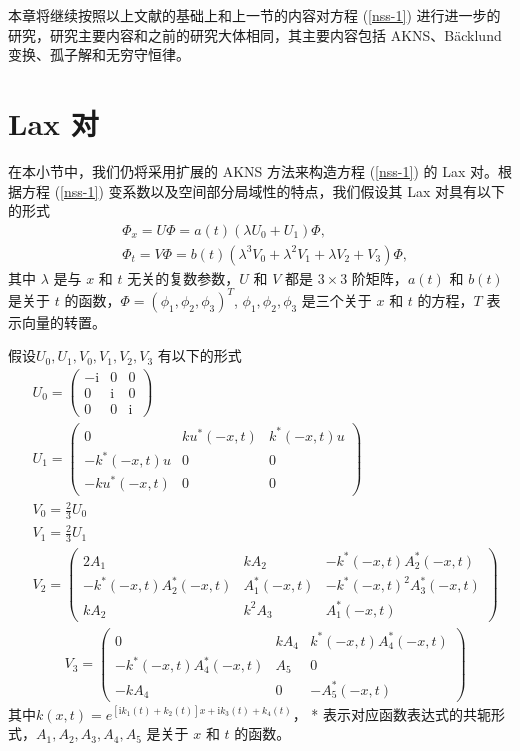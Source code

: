 本章将继续按照以上文献的基础上和上一节的内容对方程 (\ref{nss-1}) 进行进一步的研究，研究主要内容和之前的研究大体相同，其主要内容包括 AKNS、B\"{a}cklund 变换、孤子解和无穷守恒律。

\section{Lax 对}
在本小节中，我们仍将采用扩展的 AKNS 方法来构造方程 (\ref{nss-1}) 的 Lax 对。根据方程 (\ref{nss-1}) 变系数以及空间部分局域性的特点，我们假设其 Lax 对具有以下的形式
\begin{align}
  & \Phi_{x} = U\Phi = a(t)(\lambda U_{0} + U_{1})\Phi, \label{nss-2} \\
  & \Phi_{t} = V\Phi = b(t)(\lambda^{3}V_{0} + \lambda^{2}V_{1} + \lambda V_{2} + V_{3})\Phi, \label{nss-3}
\end{align}
其中 $\lambda$ 是与 $x$ 和 $t$ 无关的复数参数，$U$ 和 $V$ 都是 $3\times3$ 阶矩阵，$a(t)$ 和 $b(t)$ 是关于 $t$ 的函数，$\Phi=(\phi_1, \phi_2, \phi_3)^T$, $\phi_1, \phi_2, \phi_3$ 是三个关于 $x$ 和 $t$ 的方程，$T$ 表示向量的转置。

假设$U_{0}, U_{1}, V_{0}, V_{1}, V_{2}, V_{3}$ 有以下的形式
\begin{align}
  & U_{0} = \begin{pmatrix}
             -\mathrm{i} & 0 & 0 \\
              0 & \mathrm{i} & 0 \\
              0 & 0 & \mathrm{i}
            \end{pmatrix} \\
  & U_{1} = \begin{pmatrix}
              0 & ku^{*}(-x,t) & k^{*}(-x,t)u \\
              -k^{*}(-x,t)u & 0 & 0 \\
              -ku^{*}(-x,t) & 0 & 0
            \end{pmatrix} \\
  & V_{0} = \frac{2}{3}U_{0} \\
  & V_{1} = \frac{2}{3}U_{1} \\
  & V_{2} = \begin{pmatrix}
              2A_{1} & kA_{2} & -k^{*}(-x,t)A_{2}^{*}(-x,t) \\
              -k^{*}(-x,t)A_{2}^{*}(-x,t) & A_{1}^{*}(-x,t) & -k^{*}(-x,t)^{2}A_{3}^{*}(-x,t) \\
              kA_{2} & k^{2}A_{3} & A_{1}^{*}(-x,t)
            \end{pmatrix}
\end{align}
\begin{align}
   & V_{3} = \begin{pmatrix}
              0 & kA_{4} & k^{*}(-x,t)A_{4}^{*}(-x,t) \\
              -k^{*}(-x,t)A_{4}^{*}(-x,t) & A_{5} & 0 \\
              -kA_{4} & 0 & -A_{5}^{*}(-x,t)
            \end{pmatrix}
\end{align}
其中$k(x,t)= e^{\left[\mathrm{i}k_{1}(t) + k_2(t)\right]x + \mathrm{i}k_{3}(t) + k_4(t)}$，  * 表示对应函数表达式的共轭形式，$A_1, A_2, A_3, A_4, A_5$ 是关于 $x$ 和 $t$ 的函数。

